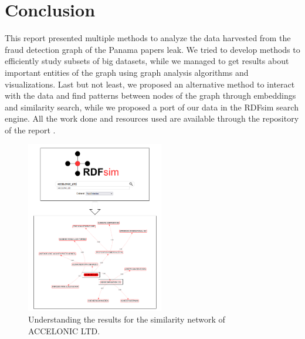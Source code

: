 \documentclass[sigconf, nonacm]{acmart}
\begin{document}
\section{Conclusion}
This report presented multiple methods to analyze the data harvested from the fraud detection graph of the Panama papers leak. We tried to develop methods to efficiently study subsets of big datasets, while we managed to get results about important entities of the graph using graph analysis algorithms and visualizations. Last but not least, we proposed an alternative method to interact with the data and find patterns between nodes of the graph through embeddings and similarity search, while we proposed a port of our data in the RDFsim search engine. All the work done and resources used are available through the repository of the report \cite{panamaPapersAnalysis}.


\begin{figure}[htp]
    \centering
    \includegraphics[width=6cm]{figures/useCase.png}
    \caption{Understanding the results for the similarity network of ACCELONIC LTD.}
    \label{fig:useCase}
\end{figure}

%
%
\pagebreak
\printbibliography %
\end{document}
